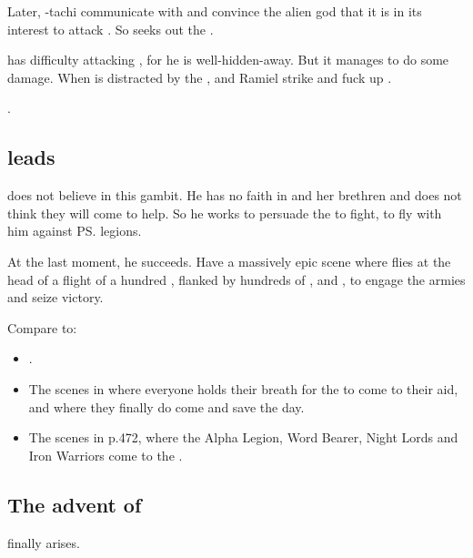\begin{garbage}
Later, \Ishnaruchaefir-tachi communicate with \HothNrul{} and convince the alien god that it is in its interest to attack \Daggerrain.
So \HothNrul{} seeks out the \banelord. 

\HothNrul{} has difficulty attacking \Daggerrain, for he is well-hidden-away. 
But it manages to do some damage. 
When \Daggerrain{} is distracted by the \xs{}, \Azraid{} and Ramiel strike and fuck up \Daggerrain. 

\HothNrul{} . 







\subsection{\Ishnaruchaefir{} leads \dragons}

\Ishnaruchaefir{} does not believe in this gambit. He has no faith in \Tiamat{} and her brethren and does not think they will come to help. So he works to persuade the \dragons{} to fight, to fly with him against \ps{\Daggerrain}{} legions. 

At the last moment, he succeeds. Have a massively epic scene where \Ishnaruchaefir{} flies at the head of a flight of a hundred \dragons, flanked by hundreds of \rachyths, \drakes{} and \pdaemons, to engage the \bane{} armies and seize victory.

Compare to: 

\begin{itemize}
  \item 
    . 
  \item 
    The scenes in  where everyone holds their breath for the \dragons{} to come to their aid, and where they finally do come and save the day.
  \item 
    The scenes in  p.472, where the Alpha Legion, Word Bearer, Night Lords and Iron Warriors come to the . 
\end{itemize}







\subsection{The advent of \Lithrim}
\Lithrim{} finally arises. 


\end{garbage}
